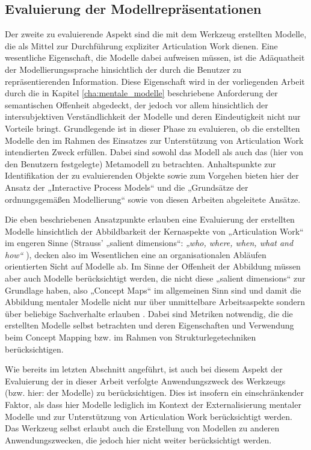 \subsection{Evaluierung der Modellrepräsentationen}
\label{sub:eval_modell}

Der zweite zu evaluierende Aspekt sind die mit dem Werkzeug erstellten Modelle, die als Mittel zur Durchführung expliziter Articulation Work dienen. Eine wesentliche Eigenschaft, die Modelle dabei aufweisen müssen, ist die Adäquatheit der Modellierungssprache hinsichtlich der durch die Benutzer zu repräsentierenden Information. Diese Eigenschaft wird in der vorliegenden Arbeit durch die in Kapitel \ref{cha:mentale_modelle} beschriebene Anforderung der semantischen Offenheit abgedeckt, der jedoch vor allem hinsichtlich der intersubjektiven Verständlichkeit der Modelle und deren Eindeutigkeit nicht nur Vorteile bringt. Grundlegende ist in dieser Phase zu evaluieren, ob die erstellten Modelle den im Rahmen des Einsatzes zur Unterstützung von Articulation Work intendierten Zweck erfüllen. Dabei sind sowohl das Modell als auch das (hier von den Benutzern festgelegte) Metamodell zu betrachten. Anhaltspunkte zur Identifikation der zu evaluierenden Objekte sowie zum Vorgehen bieten hier der Ansatz der „Interactive Process Models“ \citep{Jorgensen04} und die „Grundsätze der ordnungsgemäßen Modellierung“ \citep{Becker00} sowie von diesen Arbeiten abgeleitete Ansätze.

Die eben beschriebenen Ansatzpunkte erlauben eine Evaluierung der erstellten Modelle hinsichtlich der Abbildbarkeit der Kernaspekte von „Articulation Work“ im engeren Sinne (Strauss' „salient dimensions“: \emph{„who, where, when, what and how“} \citep{Fjuk97}), decken also im Wesentlichen eine an organisationalen Abläufen orientierten Sicht auf Modelle ab. Im Sinne der Offenheit der Abbildung müssen aber auch Modelle berücksichtigt werden, die nicht diese „salient dimensions“ zur Grundlage haben, also „Concept Maps“ \citep{Novak06} im allgemeinen Sinn sind und damit die Abbildung mentaler Modelle nicht nur über unmittelbare Arbeitsaspekte sondern über beliebige Sachverhalte erlauben \citep{Ifenthaler06}. Dabei sind Metriken notwendig, die die erstellten Modelle selbst betrachten und deren Eigenschaften und Verwendung beim Concept Mapping bzw. im Rahmen von Strukturlegetechniken berücksichtigen.

Wie bereits im letzten Abschnitt angeführt, ist auch bei diesem Aspekt der Evaluierung der in dieser Arbeit verfolgte Anwendungszweck des Werkzeugs (bzw. hier: der Modelle) zu berücksichtigen. Dies ist insofern ein einschränkender Faktor, als dass hier Modelle lediglich im Kontext der Externalisierung mentaler Modelle und zur Unterstützung von Articulation Work berücksichtigt werden. Das Werkzeug selbst erlaubt auch die Erstellung von Modellen zu anderen Anwendungszwecken, die jedoch hier nicht weiter berücksichtigt werden.  

